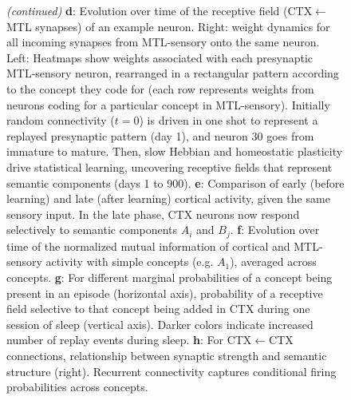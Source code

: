 \documentclass{article}
\begin{document}
\begin{figure}[t]
  \ContinuedFloat
  \captionsetup{list=off} %
  \caption{\textit{(continued)} \textbf{d}: Evolution over time of the receptive field (CTX$\leftarrow$MTL synapses) of an example neuron. Right: weight dynamics for all incoming synapses from MTL-sensory onto the same neuron. Left: Heatmaps show weights associated with each presynaptic MTL-sensory neuron, rearranged in a rectangular pattern according to the concept they code for (each row represents weights from neurons coding for a particular concept in MTL-sensory). Initially random connectivity ($t=0$) is driven in one shot to represent a replayed presynaptic pattern (day 1), and neuron 30 goes from immature to mature. Then, slow Hebbian and homeostatic plasticity drive statistical learning, uncovering receptive fields that represent semantic components (days 1 to 900). \textbf{e}: Comparison of early (before learning) and late (after learning) cortical activity, given the same sensory input. In the late phase, CTX neurons now respond selectively to semantic components $A_i$ and $B_j$. \textbf{f}: Evolution over time of the normalized mutual information of cortical and MTL-sensory activity with simple concepts (e.g. $A_1$), averaged across concepts. \textbf{g}: For different marginal probabilities of a concept being present in an episode (horizontal axis), probability of a receptive field selective to that concept being added in CTX during one session of sleep (vertical axis). Darker colors indicate increased number of replay events during sleep. \textbf{h}: For CTX$\leftarrow$CTX connections, relationship between synaptic strength and semantic structure (right). Recurrent connectivity captures conditional firing probabilities across concepts.}
\end{figure}
\newpage
\end{document}
